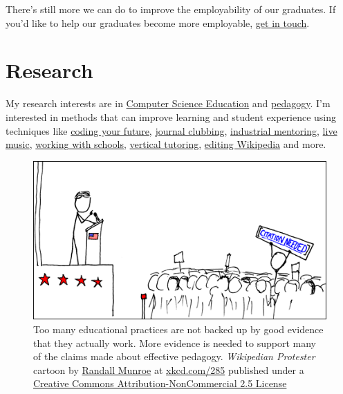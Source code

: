 \documentclass[
  12pt,
]{book}
\begin{document}
There's still more we can do to improve the employability of our graduates. If you'd like to help our graduates become more employable, \href{Contact}{get in touch}.

\hypertarget{research}{%
\chapter{Research}\label{research}}

My research interests are in \href{https://en.wikipedia.org/wiki/Computer_science_education}{Computer Science Education} and \href{https://en.wikipedia.org/wiki/Pedagogy}{pedagogy}. \citep{CERhandbook, JohnBiggs2011, Fry2014} I'm interested in methods that can improve learning and student experience using techniques like \href{https://www.cdyf.me}{coding your future}, \href{https://sigcse.cs.manchester.ac.uk/}{journal clubbing}, \href{https://www.cs.manchester.ac.uk/connect/business-engagement/industrial-mentoring/}{industrial mentoring}, \protect\hyperlink{tuningcomplete}{live music}, \href{http://www.cs.man.ac.uk/~hulld/coding-their-future.html}{working with schools}, \href{http://www.cs.man.ac.uk/~hulld/vertical-tutoring.html}{vertical tutoring}, \protect\hyperlink{wikipedia}{editing Wikipedia} and more.

\begin{figure}

{\centering \includegraphics[width=0.7\linewidth]{images/wikipedian_protester} 

}

\caption{Too many educational practices are not backed up by good evidence that they actually work. More evidence is needed to support many of the claims made about effective pedagogy. \emph{Wikipedian Protester} cartoon by \href{https://en.wikipedia.org/wiki/Randall_Munroe}{Randall Munroe} at \href{https://xkcd.com/285/}{xkcd.com/285} published under a \href{https://creativecommons.org/licenses/by-nc/2.5/}{Creative Commons Attribution-NonCommercial 2.5 License}}\label{fig:unnamed-chunk-5}
\end{figure}
\end{document}
